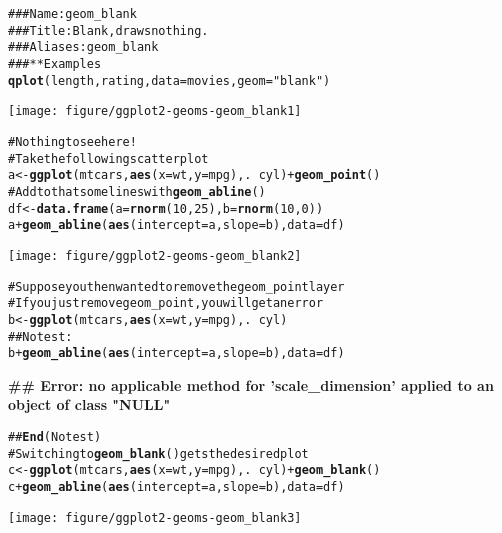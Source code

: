 \documentclass[a4paper,titlepage]{tufte-handout}\usepackage{graphicx, color}
\makeatletter
\def\maxwidth{ %
  \ifdim\Gin@nat@width>\linewidth
    \linewidth
  \else
    \Gin@nat@width
  \fi
}
\newcommand{\hlfunctioncall}[1]{\textcolor[rgb]{0.501960784313725,0,0.329411764705882}{\textbf{#1}}}%
\newcommand{\hlstring}[1]{\textcolor[rgb]{0.6,0.6,1}{#1}}%
\newcommand{\hlcomment}[1]{\textcolor[rgb]{0.180392156862745,0.6,0.341176470588235}{#1}}%
\newenvironment{kframe}{%
 \def\at@end@of@kframe{}%
 \ifinner\ifhmode%
  \def\at@end@of@kframe{\end{minipage}}%
  \begin{minipage}{\columnwidth}%
 \fi\fi%
 \def\FrameCommand##1{\hskip\@totalleftmargin \hskip-\fboxsep
 \colorbox{shadecolor}{##1}\hskip-\fboxsep
     \hskip-\linewidth \hskip-\@totalleftmargin \hskip\columnwidth}%
 \MakeFramed {\advance\hsize-\width
   \@totalleftmargin\z@ \linewidth\hsize
   \@setminipage}}%
 {\par\unskip\endMakeFramed%
 \at@end@of@kframe}
\newenvironment{knitrout}{}{} %
\makeatother
\begin{document}
\begin{knitrout}
\color{fgcolor}\begin{kframe}
\begin{alltt}
\hlcomment{### Name: geom_blank}
\hlcomment{### Title: Blank, draws nothing.}
\hlcomment{### Aliases: geom_blank}
\hlcomment{### ** Examples}
\hlfunctioncall{qplot}(length, rating, data = movies, geom = \hlstring{"blank"})
\end{alltt}
\end{kframe}\texttt{[image: figure/ggplot2-geoms-geom\_blank1]} \begin{kframe}\begin{alltt}
\hlcomment{# Nothing to see here!}
\hlcomment{# Take the following scatter plot}
a <- \hlfunctioncall{ggplot}(mtcars, \hlfunctioncall{aes}(x = wt, y = mpg), . ~ cyl) + \hlfunctioncall{geom_point}()
\hlcomment{# Add to that some lines with \hlfunctioncall{geom_abline}()}
df <- \hlfunctioncall{data.frame}(a = \hlfunctioncall{rnorm}(10, 25), b = \hlfunctioncall{rnorm}(10, 0))
a + \hlfunctioncall{geom_abline}(\hlfunctioncall{aes}(intercept = a, slope = b), data = df)
\end{alltt}
\end{kframe}\texttt{[image: figure/ggplot2-geoms-geom\_blank2]} \begin{kframe}\begin{alltt}
\hlcomment{# Suppose you then wanted to remove the geom_point layer}
\hlcomment{# If you just remove geom_point, you will get an error}
b <- \hlfunctioncall{ggplot}(mtcars, \hlfunctioncall{aes}(x = wt, y = mpg), . ~ cyl)
\hlcomment{## No test: }
b + \hlfunctioncall{geom_abline}(\hlfunctioncall{aes}(intercept = a, slope = b), data = df)
\end{alltt}


{\ttfamily\noindent\bfseries\textcolor{errorcolor}{\#\# Error: no applicable method for 'scale\_dimension' applied to an object of class "NULL"}}\begin{alltt}
\hlcomment{## \hlfunctioncall{End}(No test)}
\hlcomment{# Switching to \hlfunctioncall{geom_blank}() gets the desired plot}
c <- \hlfunctioncall{ggplot}(mtcars, \hlfunctioncall{aes}(x = wt, y = mpg), . ~ cyl) + \hlfunctioncall{geom_blank}()
c + \hlfunctioncall{geom_abline}(\hlfunctioncall{aes}(intercept = a, slope = b), data = df)
\end{alltt}
\end{kframe}\texttt{[image: figure/ggplot2-geoms-geom\_blank3]} 
\end{knitrout}
\end{document}
